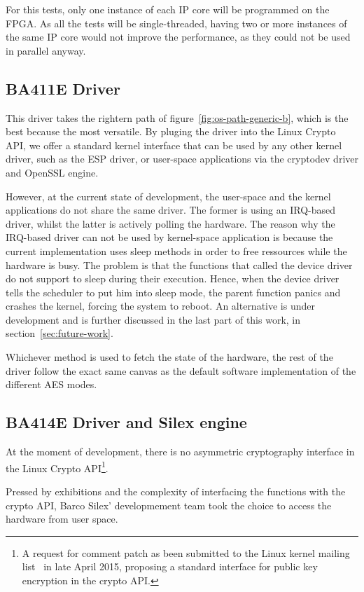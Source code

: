For this tests, only one instance of each IP core will be programmed on the FPGA.
As all the tests will be single-threaded, having two or more instances of the same IP core would not improve the performance, as they could not be used in parallel anyway.

\subsection{BA411E Driver}
This driver takes the rightern path of figure~\ref{fig:os-path-generic-b}, which is the best because the most versatile.
By pluging the driver into the Linux Crypto API, we offer a standard kernel interface that can be used by any other kernel driver, such as the ESP driver, or user-space applications via the cryptodev driver and OpenSSL engine.

However, at the current state of development, the user-space and the kernel applications do not share the same driver.
The former is using an IRQ-based driver, whilst the latter is actively polling the hardware.
The reason why the IRQ-based driver can not be used by kernel-space application is because the current implementation uses sleep methods in order to free ressources while the hardware is busy.
The problem is that the functions that called the device driver do not support to sleep during their execution.
Hence, when the device driver tells the scheduler to put him into sleep mode, the parent function panics and crashes the kernel, forcing the system to reboot.
An alternative is under development and is further discussed in the last part of this work, in section~\ref{sec:future-work}. \newline{}

Whichever method is used to fetch the state of the hardware, the rest of the driver follow the exact same canvas as the default software implementation of the different AES modes.


\subsection{BA414E Driver and Silex engine}
At the moment of development, there is no asymmetric cryptography interface in the Linux Crypto API\footnote{A request for comment patch as been submitted to the Linux kernel mailing list~\cite{crypto-api-pk-encryption} in late April 2015, proposing a standard interface for public key encryption in the crypto API.}.

Pressed by exhibitions and the complexity of interfacing the functions with the crypto API, Barco Silex' developmement team took the choice to access the hardware from user space.

